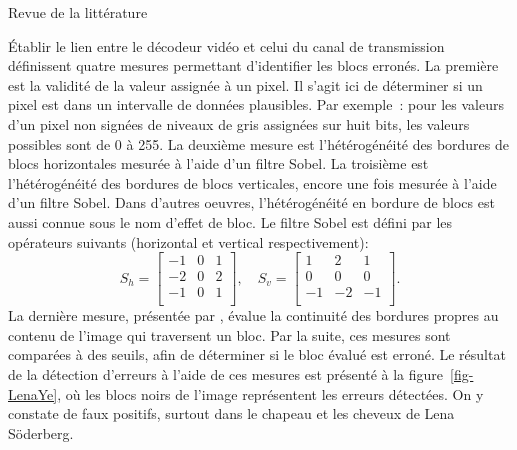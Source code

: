 \documentclass[letterpaper, twoside, 12pt,memoire]{thETS}
\newcommand{\fig}[1]{figure~\ref{#1}}
\providecommand{\DIFadd}[1]{{\protect\color{blue}\uwave{#1}}} %
\providecommand{\DIFaddbegin}{} %
\providecommand{\DIFaddend}{} %
\begin{document}
\begin{chapter}{Revue de la littérature}
\begin{section}{Établir le lien entre le décodeur vidéo et celui du canal de
transmission}
\citeauthor{Ye2003} définissent quatre mesures permettant d'identifier les blocs
erronés. La première est la validité de la valeur assignée à un pixel. Il s'agit
ici de déterminer si un pixel est dans un intervalle de données plausibles. Par
exemple~: pour les valeurs d'un pixel non signées de niveaux de gris assignées
sur huit bits, les valeurs possibles sont de 0 à 255. La deuxième mesure est
l'hétérogénéité des bordures de blocs horizontales mesurée à l'aide d'un filtre
Sobel. La troisième est l'hétérogénéité des bordures de blocs verticales, encore
une fois mesurée à l'aide d'un filtre Sobel. Dans d'autres oeuvres,
l'hétérogénéité en bordure de blocs est aussi connue sous le nom d'effet de
bloc. Le filtre Sobel est défini par les opérateurs suivants (horizontal et vertical respectivement)\DIFaddbegin \DIFadd{~}\DIFaddend :
\begin{equation}
S_h =
\begin{bmatrix}
-1 & 0 & 1\\
-2 & 0 & 2\\
-1 & 0 & 1\\
\end{bmatrix}, \quad
S_v =
\begin{bmatrix}
1 & 2 & 1\\
0 & 0 & 0\\
-1 & -2 & -1\\
\end{bmatrix}.
\end{equation}
La dernière mesure, présentée par \citeauthor{Ye2003}, évalue la continuité des
bordures propres au contenu de l'image qui traversent un bloc. Par la suite, ces
mesures sont comparées à des seuils, afin de déterminer si le bloc évalué est
erroné. Le résultat de la détection d'erreurs à l'aide de ces mesures est
présenté à la \fig{fig-LenaYe}, où les blocs noirs de l'image
 représentent les erreurs détectées. On y constate de
faux positifs, surtout dans le chapeau et les cheveux de Lena Söderberg.
\begin{figure}
\end{figure}
\end{section}
\end{chapter}
\end{document}

